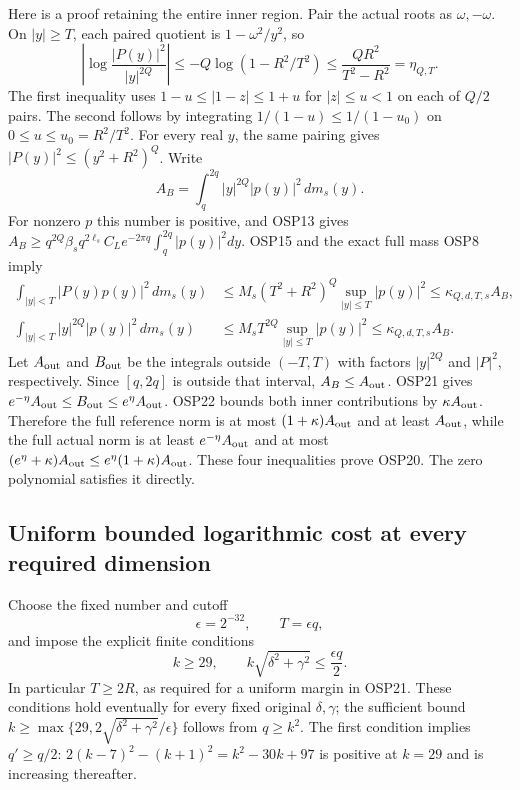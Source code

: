 \documentclass[11pt,a4paper]{article}
\begin{document}
Here is a proof retaining the entire inner region. Pair the actual
roots as $\omega,-\omega$. On $|y|\ge T$, each paired quotient is
$1-\omega^2/y^2$, so
\[
\left|\log\frac{|P(y)|^2}{|y|^{2Q}}\right|
\le -Q\log(1-R^2/T^2)
\le\frac{Q R^2}{T^2-R^2}=\eta_{Q,T}.
\tag{OSP21}
\]
The first inequality uses $1-u\le|1-z|\le1+u$ for $|z|\le u<1$
on each of $Q/2$ pairs. The second follows by integrating
$1/(1-u)\le1/(1-u_0)$ on $0\le u\le u_0=R^2/T^2$.
For every real $y$, the same pairing gives
$|P(y)|^2\le(y^2+R^2)^Q$. Write
\[
A_B=\int_q^{2q}|y|^{2Q}|p(y)|^2\,dm_s(y).
\]
For nonzero $p$ this number is positive, and OSP13 gives
$A_B\ge q^{2Q}\beta_s q^{2\ell_s}C_Le^{-2\pi q}
 \int_q^{2q}|p(y)|^2dy$.
OSP15 and the exact full mass OSP8 imply
\[
\begin{split}
\int_{|y|<T}|P(y)p(y)|^2\,dm_s(y)
 &\le M_s(T^2+R^2)^Q\sup_{|y|\le T}|p(y)|^2
 \le\kappa_{Q,d,T,s}A_B,\\
\int_{|y|<T}|y|^{2Q}|p(y)|^2\,dm_s(y)
 &\le M_sT^{2Q}\sup_{|y|\le T}|p(y)|^2
 \le\kappa_{Q,d,T,s}A_B .
\end{split}\tag{OSP22}
\]
Let $A_{\rm out}$ and $B_{\rm out}$ be the integrals outside
$(-T,T)$ with factors $|y|^{2Q}$ and $|P|^2$, respectively.
Since $[q,2q]$ is outside that interval, $A_B\le A_{\rm out}$.
OSP21 gives
$e^{-\eta}A_{\rm out}\le B_{\rm out}\le e^\eta A_{\rm out}$.
OSP22 bounds both inner contributions by $\kappa A_{\rm out}$.
Therefore the full reference norm is at most
$(1+\kappa)A_{\rm out}$ and at least $A_{\rm out}$, while the
full actual norm is at least $e^{-\eta}A_{\rm out}$ and at most
$(e^\eta+\kappa)A_{\rm out}\le e^\eta(1+\kappa)A_{\rm out}$.
These four inequalities prove OSP20. The zero polynomial satisfies
it directly.

\subsection{Uniform bounded logarithmic cost at every required dimension}

Choose the fixed number and cutoff
\[
\epsilon=2^{-32},\qquad T=\epsilon q,
\]
and impose the explicit finite conditions
\[
k\ge29,\qquad
k\sqrt{\delta^2+\gamma^2}\le\frac{\epsilon q}{2}.
\tag{OSP23}
\]
In particular $T\ge2R$, as required for a uniform margin in OSP21.
These conditions hold eventually for every fixed original
$\delta,\gamma$; the sufficient bound
$k\ge\max\{29,2\sqrt{\delta^2+\gamma^2}/\epsilon\}$
follows from $q\ge k^2$. The first condition implies $q'\ge q/2$:
$2(k-7)^2-(k+1)^2=k^2-30k+97$ is positive at $k=29$
and is increasing thereafter.
\end{document}

